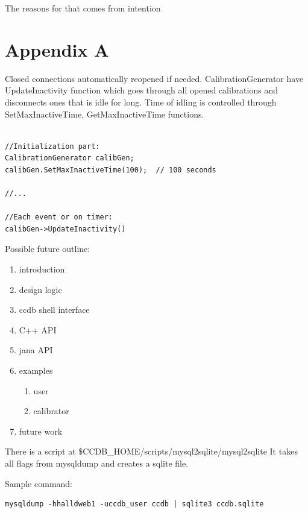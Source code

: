 \documentclass{article}
\begin{document}
The reasons for that comes from intention


\section{Appendix A}

Closed connections automatically reopened if needed. 
CalibrationGenerator have UpdateInactivity function which goes through all opened
 calibrations and disconnects ones that is idle for long. Time of idling is controlled 
 through SetMaxInactiveTime, GetMaxInactiveTime functions.


\begin{verbatim}

//Initialization part:
CalibrationGenerator calibGen;
calibGen.SetMaxInactiveTime(100);  // 100 seconds

//...

//Each event or on timer:
calibGen->UpdateInactivity()
\end{verbatim}

Possible future outline:

\begin{enumerate}
\item introduction
\item design logic
\item ccdb shell interface
\item C++ API
\item jana API
\item examples
  \begin{enumerate}
  \item user
  \item calibrator
  \end{enumerate}
\item future work
\end{enumerate}

There is a script at \$CCDB\_HOME/scripts/mysql2sqlite/mysql2sqlite
It takes all flags from mysqldump and creates a sqlite file.

Sample command:

\begin{verbatim}
mysqldump -hhalldweb1 -uccdb_user ccdb | sqlite3 ccdb.sqlite
\end{verbatim}
\end{document}
